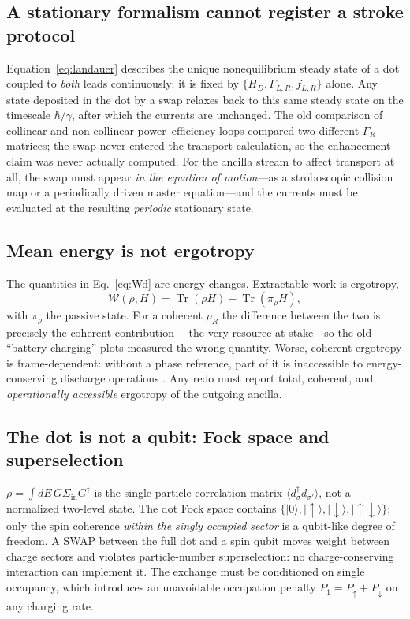 \documentclass[11pt,a4paper]{article}
\newcommand{\up}{\uparrow}
\newcommand{\dn}{\downarrow}
\newcommand{\Tr}{\operatorname{Tr}}
\newcommand{\ket}[1]{|#1\rangle}
\begin{document}
\subsection{A stationary formalism cannot register a stroke protocol}

Equation~\eqref{eq:landauer} describes the unique nonequilibrium steady state of a dot coupled to \emph{both} leads continuously; it is fixed by $\{H_D,\Gamma_{L,R},f_{L,R}\}$ alone. Any state deposited in the dot by a swap relaxes back to this same steady state on the timescale $\hbar/\gamma$, after which the currents are unchanged. The old comparison of collinear and non-collinear power--efficiency loops compared two different $\Gamma_R$ matrices; the swap never entered the transport calculation, so the enhancement claim was never actually computed. For the ancilla stream to affect transport at all, the swap must appear \emph{in the equation of motion}---as a stroboscopic collision map or a periodically driven master equation---and the currents must be evaluated at the resulting \emph{periodic} stationary state.

\subsection{Mean energy is not ergotropy}

The quantities in Eq.~\eqref{eq:Wd} are energy changes. Extractable work is ergotropy,
\begin{equation}
\mathcal{W}(\rho,H)=\Tr(\rho H)-\Tr(\pi_\rho H),
\end{equation}
with $\pi_\rho$ the passive state. For a coherent $\rho_R$ the difference between the two is precisely the coherent contribution \cite{Francica}---the very resource at stake---so the old ``battery charging'' plots measured the wrong quantity. Worse, coherent ergotropy is frame-dependent: without a phase reference, part of it is inaccessible to energy-conserving discharge operations \cite{RefFrames}. Any redo must report total, coherent, and \emph{operationally accessible} ergotropy of the outgoing ancilla.

\subsection{The dot is not a qubit: Fock space and superselection}

$\rho=\int dE\,G\Sigma_{\mathrm{in}}G^\dagger$ is the single-particle correlation matrix $\langle d^\dagger_\sigma d_{\sigma'}\rangle$, not a normalized two-level state. The dot Fock space contains $\{\ket{0},\ket{\up},\ket{\dn},\ket{\up\dn}\}$; only the spin coherence \emph{within the singly occupied sector} is a qubit-like degree of freedom. A SWAP between the full dot and a spin qubit moves weight between charge sectors and violates particle-number superselection: no charge-conserving interaction can implement it. The exchange must be conditioned on single occupancy, which introduces an unavoidable occupation penalty $P_1=P_\up+P_\dn$ on any charging rate.
\end{document}
